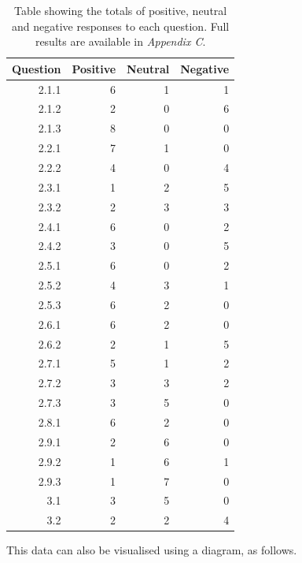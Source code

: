 \documentclass[12pt,twoside,notitlepage,xetex]{report}
\begin{document}
\begin{center}
\begin{table}[H]
\begin{center}
\begin{tabular}{|r||r|r|r|}
\hline
\multicolumn{1}{|c|}{Question} & \multicolumn{1}{c|}{Positive} & \multicolumn{1}{c|}{Neutral} & \multicolumn{1}{c|}{Negative}\\ \hline \hline
2.1.1 & 6 & 1 & 1\\ \hline
2.1.2 & 2 & 0 & 6\\ \hline
2.1.3 & 8 & 0 & 0\\ \hline
2.2.1 & 7 & 1 & 0\\ \hline
2.2.2 & 4 & 0 & 4\\ \hline
2.3.1 & 1 & 2 & 5\\ \hline
2.3.2 & 2 & 3 & 3\\ \hline
2.4.1 & 6 & 0 & 2\\ \hline
2.4.2 & 3 & 0 & 5\\ \hline
2.5.1 & 6 & 0 & 2\\ \hline
2.5.2 & 4 & 3 & 1\\ \hline
2.5.3 & 6 & 2 & 0\\ \hline
2.6.1 & 6 & 2 & 0\\ \hline
2.6.2 & 2 & 1 & 5\\ \hline
2.7.1 & 5 & 1 & 2\\ \hline
2.7.2 & 3 & 3 & 2\\ \hline
2.7.3 & 3 & 5 & 0\\ \hline
2.8.1 & 6 & 2 & 0\\ \hline
2.9.1 & 2 & 6 & 0\\ \hline
2.9.2 & 1 & 6 & 1\\ \hline
2.9.3 & 1 & 7 & 0\\ \hline
3.1 & 3 & 5 & 0\\ \hline
3.2 & 2 & 2 & 4\\
\hline
\end{tabular}
\end{center}
\caption{Table showing the totals of positive, neutral and negative responses to each question.   Full results are available in \emph{Appendix C}.}
\label{tab:FeedbackScores}
\end{table}
\end{center}

This data can also be visualised using a diagram, as follows.
\end{document}
